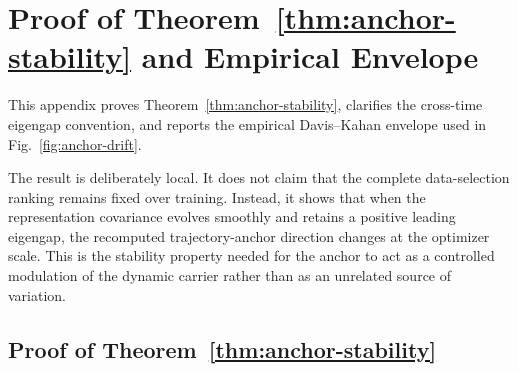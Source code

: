%
%
%


\appendix



\section{Proof of Theorem~\ref{thm:anchor-stability} and Empirical Envelope}
\label{app:anchor-stability-diagnostics}

This appendix proves Theorem~\ref{thm:anchor-stability}, clarifies the
cross-time eigengap convention, and reports the empirical
Davis--Kahan envelope used in Fig.~\ref{fig:anchor-drift}.

The result is deliberately local. It does not claim that the complete
data-selection ranking remains fixed over training. Instead, it shows
that when the representation covariance evolves smoothly and retains
a positive leading eigengap, the recomputed trajectory-anchor
direction changes at the optimizer scale. This is the stability
property needed for the anchor to act as a controlled modulation of
the dynamic carrier rather than as an unrelated source of variation.


\subsection{Proof of Theorem~\ref{thm:anchor-stability}}
\label{app:proof-stability}

